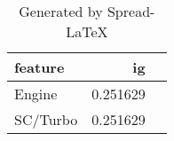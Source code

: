 \begin{table}[!htp]\centering
    \caption{Generated by Spread-LaTeX}\label{tab:weight_average }
    \scriptsize
    \begin{tabular}{lrr}\toprule
        \textbf{feature} & \textbf{ig} \\\midrule
        Engine           & 0.251629    \\
        SC/Turbo         & 0.251629    \\
        \bottomrule
    \end{tabular}
\end{table}